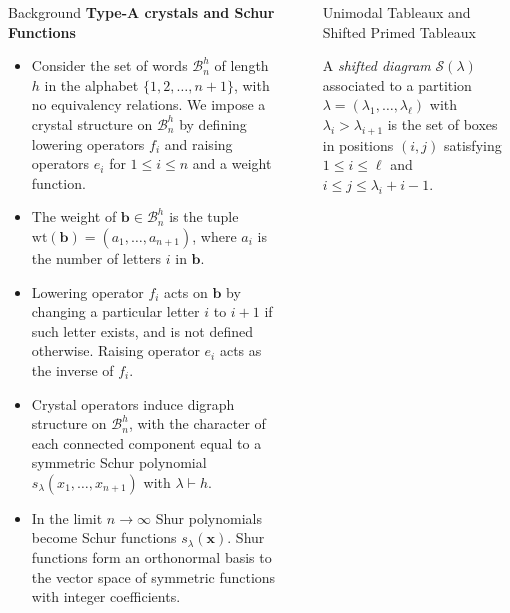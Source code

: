 \documentclass[final]{beamer}
\theoremstyle{definition}
\numberwithin{equation}{section}
\newcommand{\wt}{\mathrm{wt}}
\newlength{\sepwid}
\newlength{\onecolwid}
\newlength{\twocolwid}
\begin{document}
\begin{frame}[t]
\begin{columns}[t]
\begin{column}{\twocolwid}
\begin{columns}[t]
\begin{column}{\onecolwid}
\begin{block}{Background}
\textbf{Type-A crystals and Schur Functions}
\begin{itemize}
\item Consider the set of words $\mathcal{B}_n^h$ of length $h$ in the alphabet $\{1,2,\ldots,n+1\}$, with no equivalency relations. We impose a crystal structure on $\mathcal{B}_n^h$ by defining lowering operators $f_i$ and raising operators $e_i$ for $1\leqslant i \leqslant n$ and a weight function.
\item The weight of $\mathbf{b} \in \mathcal{B}_n^h$ is the tuple $\wt(\mathbf{b}) = (a_1,\ldots, a_{n+1})$, where $a_i$ is the number of letters $i$ in $\mathbf{b}$.
\item Lowering operator $f_i$ acts on $\mathbf{b}$ by changing a particular letter $i$ to $i+1$ if such letter exists, and is not defined otherwise. Raising operator $e_i$ acts as the inverse of $f_i$.
\item Crystal operators induce digraph structure on $\mathcal{B}_n^h$, with the character of each connected component equal to a symmetric Schur polynomial $s_{\lambda}(x_1,\ldots,x_{n+1})$ with $\lambda\vdash h$.
\item In the limit $n\to\infty$ Shur polynomials become Schur functions $s_\lambda(\mathbf{x})$. Shur functions form an orthonormal basis to the vector space of symmetric functions with integer coefficients.
\end{itemize}

\end{block}


\end{column} %

\begin{column}{\sepwid}\end{column} %

\begin{column}{\onecolwid}\vspace{-.8in} %



\begin{block}{Unimodal Tableaux and Shifted Primed Tableaux}

A \textit{shifted diagram} $\mathcal{S}(\lambda)$ associated to a partition $\lambda = (\lambda_1,\ldots,\lambda_\ell)$ with $\lambda_i > \lambda_{i+1}$ is the set of 
boxes in positions $(i,j)$ satisfying $1\leqslant i\leqslant \ell$ and $ i\leqslant j\leqslant \lambda_i+i-1$.


\end{block}
\end{column}
\end{columns}
\end{column}
\end{columns}
\end{frame}
\end{document}
